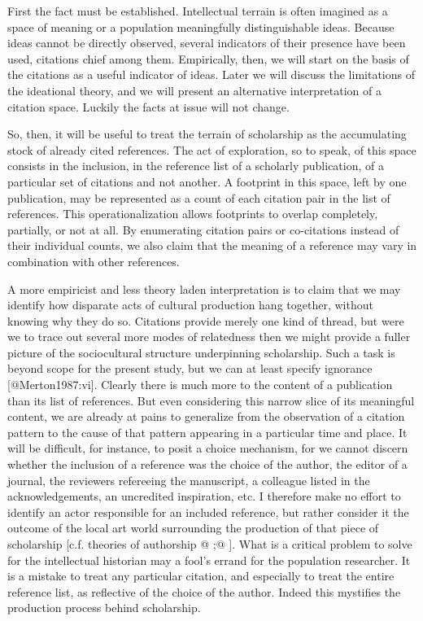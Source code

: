 \documentclass[]{article}
\begin{document}
First the fact must be established. Intellectual terrain is often
imagined as a space of meaning or a population meaningfully
distinguishable ideas. Because ideas cannot be directly observed,
several indicators of their presence have been used, citations chief
among them. Empirically, then, we will start on the basis of the
citations as a useful indicator of ideas. Later we will discuss the
limitations of the ideational theory, and we will present an alternative
interpretation of a citation space. Luckily the facts at issue will not
change.

So, then, it will be useful to treat the terrain of scholarship as the
accumulating stock of already cited references. The act of exploration,
so to speak, of this space consists in the inclusion, in the reference
list of a scholarly publication, of a particular set of citations and
not another. A footprint in this space, left by one publication, may be
represented as a count of each citation pair in the list of references.
This operationalization allows footprints to overlap completely,
partially, or not at all. By enumerating citation pairs or co-citations
instead of their individual counts, we also claim that the meaning of a
reference may vary in combination with other references.

A more empiricist and less theory laden interpretation is to claim that
we may identify how disparate acts of cultural production hang together,
without knowing why they do so. Citations provide merely one kind of
thread, but were we to trace out several more modes of relatedness then
we might provide a fuller picture of the sociocultural structure
underpinning scholarship. Such a task is beyond scope for the present
study, but we can at least specify ignorance {[}@Merton1987:vi{]}.
Clearly there is much more to the content of a publication than its list
of references. But even considering this narrow slice of its meaningful
content, we are already at pains to generalize from the observation of a
citation pattern to the cause of that pattern appearing in a particular
time and place. It will be difficult, for instance, to posit a choice
mechanism, for we cannot discern whether the inclusion of a reference
was the choice of the author, the editor of a journal, the reviewers
refereeing the manuscript, a colleague listed in the acknowledgements,
an uncredited inspiration, etc. I therefore make no effort to identify
an actor responsible for an included reference, but rather consider it
the outcome of the local art world surrounding the production of that
piece of scholarship {[}c.f. theories of authorship @ ;@ {]}. What is a
critical problem to solve for the intellectual historian may a fool's
errand for the population researcher. It is a mistake to treat any
particular citation, and especially to treat the entire reference list,
as reflective of the choice of the author. Indeed this mystifies the
production process behind scholarship.
\end{document}
